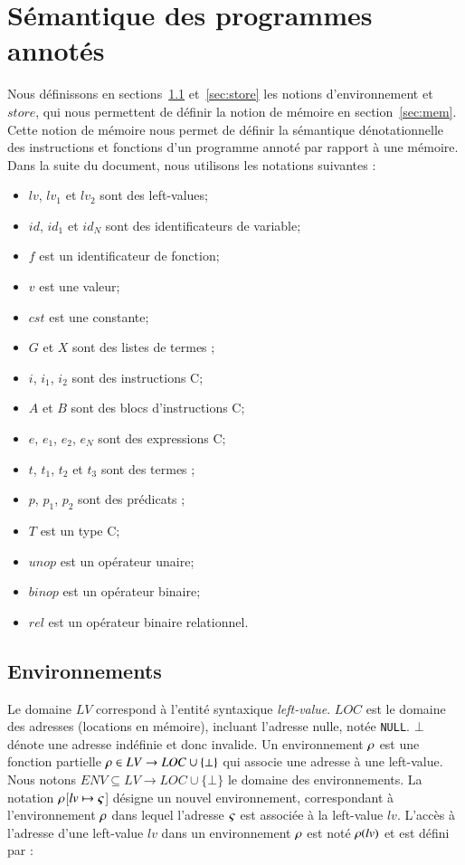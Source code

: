 \section{Sémantique des programmes annotés}
\label{sec:lang-semantics}


Nous définissons en sections~\ref{sec:env} et~\ref{sec:store} les notions
d'environnement et $store$, qui nous permettent de définir la notion de mémoire
en section~\ref{sec:mem}.
Cette notion de mémoire nous permet de définir la sémantique dénotationnelle des
instructions et fonctions d'un programme annoté par rapport à une mémoire.
Dans la suite du document, nous utilisons les notations suivantes :
\begin{itemize}
\item $\mathit{lv}$, $\mathit{lv_1}$ et $\mathit{lv_2}$ sont des left-values;
\item $\mathit{id}$, $\mathit{id_1}$ et $\mathit{id_N}$ sont des identificateurs
  de variable;
\item $f$ est un identificateur de fonction;
\item $v$ est une valeur;
\item $\mathit{cst}$ est une constante;
\item $G$ et $X$ sont des listes de termes \eacsl;
\item $i$, $i_1$, $i_2$ sont des instructions C;
\item $A$ et $B$ sont des blocs d'instructions C;
\item $e$, $e_1$, $e_2$, $e_N$ sont des expressions C;
\item $t$, $t_1$, $t_2$ et $t_3$ sont des termes \eacsl;
\item $p$, $p_1$, $p_2$ sont des prédicats \eacsl;
\item $T$ est un type C;
\item $\mathit{unop}$ est un opérateur unaire;
\item $\mathit{binop}$ est un opérateur binaire;
\item $\mathit{rel}$ est un opérateur binaire relationnel.
\end{itemize}


\subsection{Environnements}
\label{sec:env}

Le domaine $LV$ correspond à l'entité syntaxique \textit{left-value}.
$LOC$ est le domaine des adresses (locations en mémoire), incluant l'adresse
nulle, notée \lstinline'NULL'.
$\bot$ dénote une adresse indéfinie et donc invalide.
Un environnement $\rho$ est une fonction partielle
$\rho \in LV \rightarrow LOC \cup \{\bot\}$
qui associe une adresse à une left-value.
Nous notons $ENV \subseteq LV \rightarrow LOC \cup \{\bot\}$ le domaine des
environnements.
La notation $\rho$[$\mathit{lv} \mapsto \varsigma$] désigne un nouvel environnement,
correspondant à l'environnement $\rho$ dans lequel l'adresse $\varsigma$ est associée
à la left-value $\mathit{lv}$.
L'accès à l'adresse d'une left-value $\mathit{lv}$ dans un environnement $\rho$
est noté $\rho(\mathit{lv})$ et est défini par :

